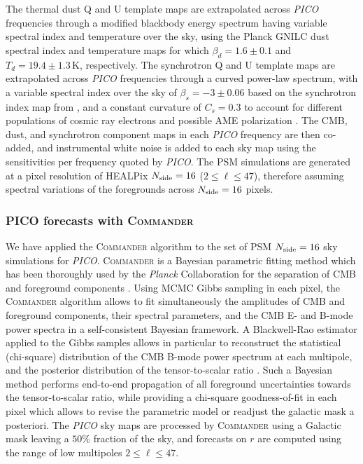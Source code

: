 \documentclass[PICOReport.tex]{subfiles}
\begin{document}
The thermal dust Q and U template maps are extrapolated across \emph{PICO} frequencies through a modified blackbody energy spectrum having variable spectral index and temperature over the sky, using the Planck {\sc GNILC} dust spectral index and temperature maps for which ${\beta_d = 1.6\pm 0.1}$ and ${T_d=19.4 \pm 1.3}$\,K, respectively. The synchrotron Q and U template maps are extrapolated across \emph{PICO} frequencies through a curved power-law spectrum, with a variable spectral index over the sky of ${\beta_s = -3\pm 0.06}$ based on the synchrotron index map from \cite{Miville-Deschenes/etal:2008}, and a constant curvature of $C_s = 0.3$ \cite{Kogut/etal:2007} to account for different populations of cosmic ray electrons  and possible AME polarization \cite{dickinson/etal:2018}. The CMB, dust, and synchrotron component maps in each \emph{PICO} frequency are then co-added, and instrumental white noise is added to each sky map using the sensitivities per frequency quoted by \emph{PICO}.
The PSM simulations are generated at a pixel resolution of HEALPix \cite{gorski/etal:2005} $N_{\rm side}=16$ ($2 \leq \ell \leq 47$), therefore assuming spectral variations of the foregrounds across $N_{\rm side}=16$ pixels.

\subsubsection{ PICO forecasts with \textsc{Commander}}

We have applied the \textsc{Commander} algorithm \cite{eriksen/etal:2008} to the set of PSM $N_{\rm side}=16$ sky simulations for \emph{PICO}.
\textsc{Commander} is a Bayesian parametric fitting method which has been thoroughly used by the \emph{Planck} Collaboration for the separation of CMB and foreground components \cite{Planck_2015_X,Planck_2018_IV}. Using MCMC Gibbs sampling in each pixel, the \textsc{Commander} algorithm allows to fit simultaneously the amplitudes of CMB and foreground components, their spectral parameters, and the CMB E- and B-mode power spectra in a self-consistent Bayesian framework. A Blackwell-Rao estimator applied to the Gibbs samples allows in particular to reconstruct the statistical (chi-square) distribution of the CMB B-mode power spectrum at each multipole, and the posterior distribution of the tensor-to-scalar ratio \cite{Remazeilles/etal:2016,Remazeilles/etal:2018}. Such a Bayesian method performs end-to-end propagation of all foreground uncertainties towards the tensor-to-scalar ratio, while providing a chi-square goodness-of-fit in each pixel which allows to revise the parametric model or readjust the galactic mask a posteriori. The \emph{PICO} sky maps are processed by \textsc{Commander} using a Galactic mask leaving a $50$\% fraction of the sky, and forecasts on $r$ are computed using the range of low multipoles $2 \leq \ell \leq 47$.
\end{document}
